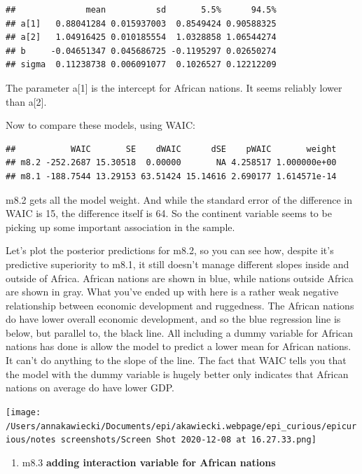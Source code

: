 \documentclass[
]{article}
\providecommand{\tightlist}{%
  \setlength{\itemsep}{0pt}\setlength{\parskip}{0pt}}
\begin{document}
\begin{verbatim}
##              mean          sd       5.5%      94.5%
## a[1]   0.88041284 0.015937003  0.8549424 0.90588325
## a[2]   1.04916425 0.010185554  1.0328858 1.06544274
## b     -0.04651347 0.045686725 -0.1195297 0.02650274
## sigma  0.11238738 0.006091077  0.1026527 0.12212209
\end{verbatim}

The parameter a{[}1{]} is the intercept for African nations. It seems
reliably lower than a{[}2{]}.

Now to compare these models, using WAIC:

\begin{verbatim}
##           WAIC       SE    dWAIC      dSE    pWAIC       weight
## m8.2 -252.2687 15.30518  0.00000       NA 4.258517 1.000000e+00
## m8.1 -188.7544 13.29153 63.51424 15.14616 2.690177 1.614571e-14
\end{verbatim}

m8.2 gets all the model weight. And while the standard error of the
difference in WAIC is 15, the difference itself is 64. So the continent
variable seems to be picking up some important association in the
sample.

Let's plot the posterior predictions for m8.2, so you can see how,
despite it's predictive superiority to m8.1, it still doesn't manage
different slopes inside and outside of Africa. African nations are shown
in blue, while nations outside Africa are shown in gray. What you've
ended up with here is a rather weak negative relationship between
economic development and ruggedness. The African nations do have lower
overall economic development, and so the blue regression line is below,
but parallel to, the black line. All including a dummy variable for
African nations has done is allow the model to predict a lower mean for
African nations. It can't do anything to the slope of the line. The fact
that WAIC tells you that the model with the dummy variable is hugely
better only indicates that African nations on average do have lower GDP.

\texttt{[image: /Users/annakawiecki/Documents/epi/akawiecki.webpage/epi\_curious/epicurious/notes screenshots/Screen Shot 2020-12-08 at 16.27.33.png]}

\begin{enumerate}
\def\labelenumi{\arabic{enumi}.}
\setcounter{enumi}{2}
\tightlist
\item
  m8.3 \textbf{adding interaction variable for African nations}
\end{enumerate}
\end{document}

